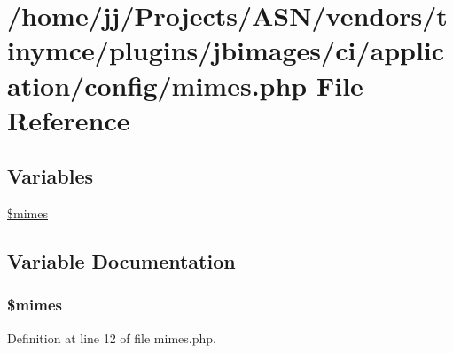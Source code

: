 \hypertarget{mimes_8php}{}\section{/home/jj/\+Projects/\+A\+S\+N/vendors/tinymce/plugins/jbimages/ci/application/config/mimes.php File Reference}
\label{mimes_8php}
\subsection*{Variables}
\begin{DoxyCompactItemize}
\item 
\hyperlink{mimes_8php_a2ce7d338d1fd0f0d971ba6213ac298a2}{\$mimes}
\end{DoxyCompactItemize}


\subsection{Variable Documentation}
\subsubsection[{\texorpdfstring{\$mimes}{$mimes}}]{\setlength{\rightskip}{0pt plus 5cm}\$mimes}\hypertarget{mimes_8php_a2ce7d338d1fd0f0d971ba6213ac298a2}{}\label{mimes_8php_a2ce7d338d1fd0f0d971ba6213ac298a2}


Definition at line 12 of file mimes.\+php.


